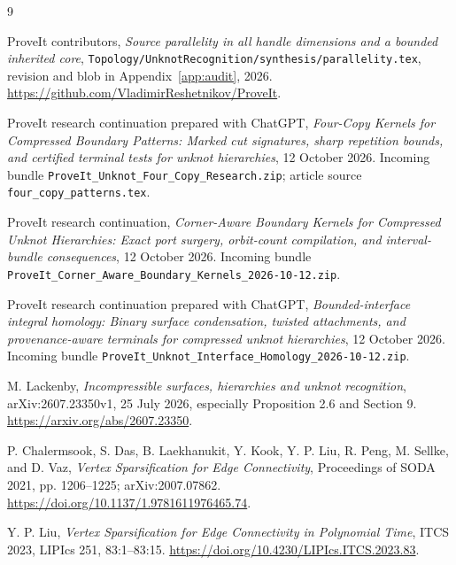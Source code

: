 \documentclass[11pt,a4paper]{article}
\theoremstyle{definition}
\theoremstyle{remark}
\newcommand{\code}[1]{\nolinkurl{#1}}
\begin{document}
\clearpage
\begin{thebibliography}{9}
ProveIt contributors, \emph{Source parallelity in all handle dimensions and a bounded inherited core},
\code{Topology/UnknotRecognition/synthesis/parallelity.tex}, revision and blob in Appendix~\ref{app:audit}, 2026.
\url{https://github.com/VladimirReshetnikov/ProveIt}.

ProveIt research continuation prepared with ChatGPT, \emph{Four-Copy Kernels for Compressed Boundary Patterns: Marked cut signatures, sharp repetition bounds, and certified terminal tests for unknot hierarchies}, 12 October 2026. Incoming bundle \code{ProveIt_Unknot_Four_Copy_Research.zip}; article source \code{four_copy_patterns.tex}.

ProveIt research continuation, \emph{Corner-Aware Boundary Kernels for Compressed Unknot Hierarchies: Exact port surgery, orbit-count compilation, and interval-bundle consequences}, 12 October 2026. Incoming bundle \code{ProveIt_Corner_Aware_Boundary_Kernels_2026-10-12.zip}.

ProveIt research continuation prepared with ChatGPT, \emph{Bounded-interface integral homology: Binary surface condensation, twisted attachments, and provenance-aware terminals for compressed unknot hierarchies}, 12 October 2026. Incoming bundle \code{ProveIt_Unknot_Interface_Homology_2026-10-12.zip}.

M. Lackenby, \emph{Incompressible surfaces, hierarchies and unknot recognition}, arXiv:2607.23350v1, 25 July 2026, especially Proposition 2.6 and Section 9.
\url{https://arxiv.org/abs/2607.23350}.

P. Chalermsook, S. Das, B. Laekhanukit, Y. Kook, Y. P. Liu, R. Peng, M. Sellke, and D. Vaz,
\emph{Vertex Sparsification for Edge Connectivity}, Proceedings of SODA 2021, pp. 1206--1225; arXiv:2007.07862.
\url{https://doi.org/10.1137/1.9781611976465.74}.

Y. P. Liu, \emph{Vertex Sparsification for Edge Connectivity in Polynomial Time},
ITCS 2023, LIPIcs 251, 83:1--83:15.
\url{https://doi.org/10.4230/LIPIcs.ITCS.2023.83}.
\end{thebibliography}
\end{document}
